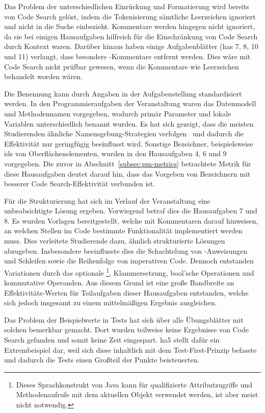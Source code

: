 Das Problem der unterschiedlichen Einrückung und Formatierung wird bereits von Code Search gelöst, indem die Tokenisierung sämtliche Leerzeichen ignoriert und nicht in die Suche einbezieht.
Kommentare werden hingegen nicht ignoriert, da sie bei einigen Hausaufgaben hilfreich für die Einschränkung von Code Search durch Kontext waren.
Darüber hinaus haben einige Aufgabenblätter (\acp{ha} 7, 8, 10 und 11) verlangt, dass besondere -Kommentare entfernt werden.
Dies wäre mit Code Search nicht prüfbar gewesen, wenn die Kommentare wie Leerzeichen behandelt worden wären.

Die Benennung kann durch Angaben in der Aufgabenstellung standardisiert werden.
In den Programmieraufgaben der Veranstaltung waren das Datenmodell und Methodennamen vorgegeben, wodurch primär Parameter und lokale Variablen unterschiedlich benannt wurden.
Es hat sich gezeigt, dass die meisten Studierenden ähnliche Namensgebung-Strategien verfolgen~ und dadurch die Effektivität nur geringfügig beeinflusst wird.
Sonstige Bezeichner, beispielsweise \acp{id} von Oberflächenelementen, wurden in den Hausaufgaben 4, 6 und 9 vorgegeben.
Die zuvor in Abschnitt~\ref{subsec:pm-metrics} betrachtete Metrik für diese Hausaufgaben deutet darauf hin, dass das Vorgeben von Bezeichnern mit besserer Code Search-Effektivität verbunden ist.

Für die Strukturierung hat sich im Verlauf der Veranstaltung eine unbeabsichtigte Lösung ergeben.
Vorwiegend betraf dies die Hausaufgaben 7 und 8.
Es wurden Vorlagen bereitgestellt, welche mit Kommentaren darauf hinweisen, an welchen Stellen im Code bestimmte Funktionalität implementiert werden muss.
Dies verleitete Studierende dazu, ähnlich strukturierte Lösungen abzugeben.
Insbesondere beeinflusste dies die Schachtelung von -Anweisungen und Schleifen sowie die Reihenfolge von imperativen Code.
Dennoch entstanden Variationen durch das optionale \footnote{
    Dieses Sprachkonstrukt von Java kann für qualifizierte Attributzugriffe und Methodenaufrufe mit dem aktuellen Objekt verwendet werden, ist aber meist nicht notwendig.
}, Klammersetzung, bool'sche Operationen und kommutative Operanden.
Aus diesem Grund ist eine große Bandbreite an Effektivitäts-Werten für Teilaufgaben dieser Hausaufgaben entstanden, welche sich jedoch insgesamt zu einem mittelmäßigen Ergebnis ausgleichen.

Das Problem der Beispielwerte in Tests hat sich über alle Übungsblätter mit solchen bemerkbar gemacht.
Dort wurden teilweise keine Ergebnisse von Code Search gefunden und somit keine Zeit eingespart.
\ac{ha}5 stellt dafür ein Extrembeispiel dar, weil sich diese inhaltlich mit dem Test-First-Prinzip befasste und dadurch die Tests einen Großteil der Punkte beisteuerten.

